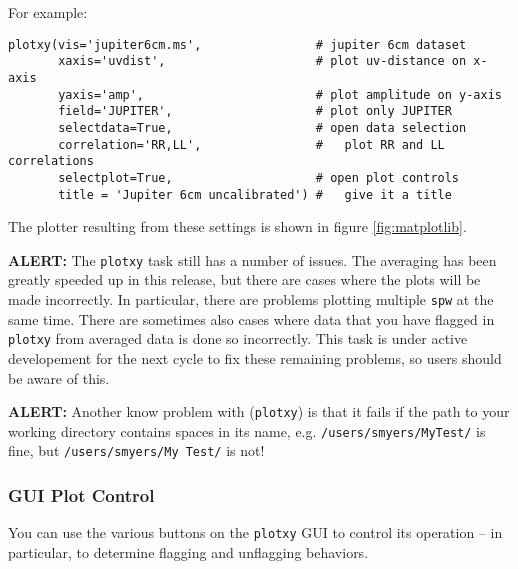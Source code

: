 For example:
\small
\begin{verbatim}
plotxy(vis='jupiter6cm.ms',                # jupiter 6cm dataset
       xaxis='uvdist',                     # plot uv-distance on x-axis
       yaxis='amp',                        # plot amplitude on y-axis
       field='JUPITER',                    # plot only JUPITER
       selectdata=True,                    # open data selection
       correlation='RR,LL',                #   plot RR and LL correlations
       selectplot=True,                    # open plot controls
       title = 'Jupiter 6cm uncalibrated') #   give it a title 
\end{verbatim}
\normalsize
The plotter resulting from these settings is shown in figure \ref{fig:matplotlib}.  

{\bf ALERT:} The {\tt plotxy} task still has a number of issues.
The averaging has been greatly speeded up in this release, but there
are cases where the plots will be made incorrectly.  In particular,
there are problems plotting multiple {\tt spw} at the same time.
There are sometimes also cases where data that you have flagged in 
{\tt plotxy} from averaged data is done so incorrectly.  This task is
under active developement for the next cycle to fix these remaining 
problems, so users should be aware of this.

{\bf ALERT:} Another know problem with ({\tt plotxy}) is that it
fails if the path to your working directory contains spaces in
its name, e.g. {\tt /users/smyers/MyTest/} is fine, but 
{\tt /users/smyers/My\ Test/} is not!



\subsubsection{GUI Plot Control}
\label{section:edit.plot.plotxy.control}

You can use the various buttons on the {\tt plotxy} GUI to control
its operation -- in particular, to determine flagging and unflagging
behaviors.

